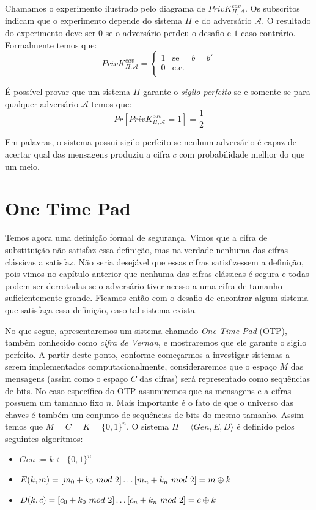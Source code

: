 Chamamos o experimento ilustrado pelo diagrama de $PrivK^{eav}_{\Pi, \mathcal{A}}$.
Os subscritos indicam que o experimento depende do sistema $\Pi$ e do adversário $\mathcal{A}$.
O resultado do experimento deve ser $0$ se o adversário perdeu o desafio e $1$ caso contrário.
Formalmente temos que:
\begin{displaymath}
  PrivK^{eav}_{\Pi, \mathcal{A}} = \left\{
    \begin{array}{lcl}
      1 & \textrm{se} & b = b'\\
      0 & \textrm{c.c.} &\\
    \end{array}
    \right.
\end{displaymath}

É possível provar que um sistema $\Pi$ garante o {\em sigilo perfeito} se e somente se para qualquer adversário $\mathcal{A}$ temos que:
\begin{displaymath}
Pr[PrivK^{eav}_{\Pi, \mathcal{A}} = 1] = \frac{1}{2}
\end{displaymath}

Em palavras, o sistema possui sigilo perfeito se nenhum adversário é capaz de acertar qual das mensagens produziu a cifra $c$ com probabilidade melhor do que um meio.

\section{One Time Pad}
\label{sec:otp}

Temos agora uma definição formal de segurança.
Vimos que a cifra de substituição não satisfaz essa definição, mas na verdade nenhuma das cifras clássicas a satisfaz.
Não seria desejável que essas cifras satisfizessem a definição, pois vimos no capítulo anterior que nenhuma das cifras clássicas é segura e todas podem ser derrotadas se o adversário tiver acesso a uma cifra de tamanho suficientemente grande.
Ficamos então com o desafio de encontrar algum sistema que satisfaça essa definição, caso tal sistema exista.

No que segue, apresentaremos um sistema chamado {\em One Time Pad} (OTP), também conhecido como {\em cifra de Vernan}, e mostraremos que ele garante o sigilo perfeito.
A partir deste ponto, conforme começarmos a investigar sistemas a serem implementados computacionalmente, consideraremos que o espaço $M$ das mensagens (assim como o espaço $C$ das cifras) será representado como sequências de bits.
No caso específico do OTP assumiremos que as mensagens e a cifras possuem um tamanho fixo $n$.
Mais importante é o fato de que o universo das chaves é também um conjunto de sequências de bits do mesmo tamanho.
Assim temos que $M = C = K = \{0,1\}^n$.
O sistema $\Pi = \langle Gen, E, D \rangle$ é definido pelos seguintes algoritmos:
\begin{itemize}
\item $Gen := k \leftarrow \{0,1\}^n$
\item $E(k,m) = [m_0 + k_0\ mod\ 2] \dots [m_n + k_n\ mod\ 2] = m \oplus k$
\item $D(k,c) = [c_0 + k_0\ mod\ 2] \dots [c_n + k_n\ mod\ 2] = c \oplus k$
\end{itemize}

